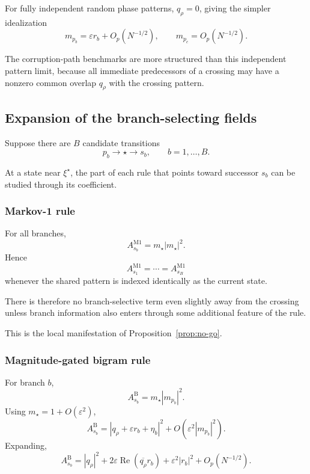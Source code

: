 For fully independent random phase patterns, $q_\rho=0$, giving the simpler
idealization
\begin{equation}
m_{p_b}
=
\varepsilon r_b+O_p(N^{-1/2}),
\qquad
m_{p_c}
=
O_p(N^{-1/2}).
\end{equation}

The corruption-path benchmarks are more structured than this independent
pattern limit, because all immediate predecessors of a crossing may have a
nonzero common overlap $q_\rho$ with the crossing pattern.

\subsection{Expansion of the branch-selecting fields}

Suppose there are $B$ candidate transitions
\begin{equation}
p_b\rightarrow \star\rightarrow s_b,
\qquad
b=1,\ldots,B.
\end{equation}

At a state near $\xi^\star$, the part of each rule that points toward successor
$s_b$ can be studied through its coefficient.

\subsubsection{Markov-1 rule}

For all branches,
\begin{equation}
A_{s_b}^{\mathrm{M1}}
=
m_\star|m_\star|^2.
\end{equation}
Hence
\begin{equation}
A_{s_1}^{\mathrm{M1}}
=
\cdots
=
A_{s_B}^{\mathrm{M1}}
\end{equation}
whenever the shared pattern is indexed identically as the current state.

There is therefore no branch-selective term even slightly away from the
crossing unless branch information also enters through some additional
feature of the rule.

This is the local manifestation of Proposition~\ref{prop:no-go}.

\subsubsection{Magnitude-gated bigram rule}

For branch $b$,
\begin{equation}
A_{s_b}^{\mathrm{B}}
=
m_\star |m_{p_b}|^2.
\end{equation}
Using $m_\star=1+O(\varepsilon^2)$,
\begin{equation}
A_{s_b}^{\mathrm{B}}
=
\left|
q_\rho+\varepsilon r_b+\eta_b
\right|^2
+
O(\varepsilon^2|m_{p_b}|^2).
\end{equation}
Expanding,
\begin{equation}
A_{s_b}^{\mathrm{B}}
=
|q_\rho|^2
+
2\varepsilon
\operatorname{Re}
\left(
\overline{q_\rho}r_b
\right)
+
\varepsilon^2|r_b|^2
+
O_p(N^{-1/2}).
\label{eq:bigram-expansion}
\end{equation}

